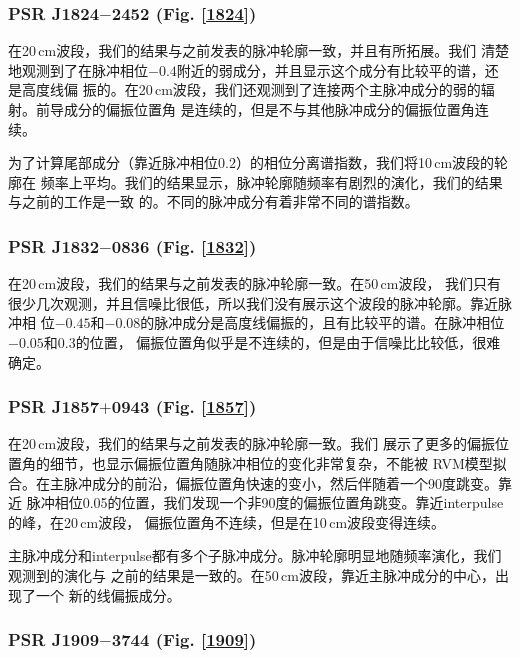 \subsubsection{PSR J1824$-$2452 (Fig. \ref{1824})}

在20\,cm波段，我们的结果与之前发表的脉冲轮廓一致，并且有所拓展\supercite{Yan11a}。我们
清楚地观测到了在脉冲相位$-0.4$附近的弱成分，并且显示这个成分有比较平的谱，还是高度线偏
振的。在20\,cm波段，我们还观测到了连接两个主脉冲成分的弱的辐射。前导成分的偏振位置角
是连续的，但是不与其他脉冲成分的偏振位置角连续。

为了计算尾部成分（靠近脉冲相位$0.2$）的相位分离谱指数，我们将10\,cm波段的轮廓在
频率上平均。我们的结果显示，脉冲轮廓随频率有剧烈的演化，我们的结果与之前的工作是一致
的\supercite{Stairs99}。不同的脉冲成分有着非常不同的谱指数。

\subsubsection{PSR J1832$-$0836 (Fig. \ref{1832})}

在20\,cm波段，我们的结果与之前发表的脉冲轮廓一致\supercite{Burgay13}。在50\,cm波段，
我们只有很少几次观测，并且信噪比很低，所以我们没有展示这个波段的脉冲轮廓。靠近脉冲相
位$-0.45$和$-0.08$的脉冲成分是高度线偏振的，且有比较平的谱。在脉冲相位$-0.05$和0.3的位置，
偏振位置角似乎是不连续的，但是由于信噪比比较低，很难确定。

\subsubsection{PSR J1857$+$0943 (Fig. \ref{1857})}

在20\,cm波段，我们的结果与之前发表的脉冲轮廓一致\supercite{Xilouris98,Yan11a}。我们
展示了更多的偏振位置角的细节，也显示偏振位置角随脉冲相位的变化非常复杂，不能被
RVM模型拟合。在主脉冲成分的前沿，偏振位置角快速的变小，然后伴随着一个90度跳变。靠近
脉冲相位0.05的位置，我们发现一个非90度的偏振位置角跳变。靠近interpulse的峰，在20\,cm波段，
偏振位置角不连续，但是在10\,cm波段变得连续。

主脉冲成分和interpulse都有多个子脉冲成分。脉冲轮廓明显地随频率演化，我们观测到的演化与
之前的结果是一致的\supercite{Thorsett90}。在50\,cm波段，靠近主脉冲成分的中心，出现了一个
新的线偏振成分。

\subsubsection{PSR J1909$-$3744 (Fig. \ref{1909})}

